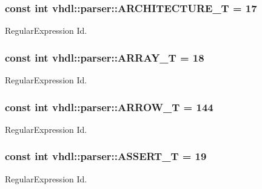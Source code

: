 \subsubsection[{A\+R\+C\+H\+I\+T\+E\+C\+T\+U\+R\+E\+\_\+\+T}]{\setlength{\rightskip}{0pt plus 5cm}const int vhdl\+::parser\+::\+A\+R\+C\+H\+I\+T\+E\+C\+T\+U\+R\+E\+\_\+\+T = 17}\label{namespacevhdl_1_1parser_af0012e28fb9ccb82c9da77dea0e16306}
Regular\+Expression Id. \hypertarget{namespacevhdl_1_1parser_a577d9a64a538d79fbbd07f2914a9b32c}{}
\subsubsection[{A\+R\+R\+A\+Y\+\_\+\+T}]{\setlength{\rightskip}{0pt plus 5cm}const int vhdl\+::parser\+::\+A\+R\+R\+A\+Y\+\_\+\+T = 18}\label{namespacevhdl_1_1parser_a577d9a64a538d79fbbd07f2914a9b32c}
Regular\+Expression Id. \hypertarget{namespacevhdl_1_1parser_a9676969d3bfe6c86f9e0a77081d29c5a}{}
\subsubsection[{A\+R\+R\+O\+W\+\_\+\+T}]{\setlength{\rightskip}{0pt plus 5cm}const int vhdl\+::parser\+::\+A\+R\+R\+O\+W\+\_\+\+T = 144}\label{namespacevhdl_1_1parser_a9676969d3bfe6c86f9e0a77081d29c5a}
Regular\+Expression Id. \hypertarget{namespacevhdl_1_1parser_a25e9088030a083ed630db133150ed351}{}
\subsubsection[{A\+S\+S\+E\+R\+T\+\_\+\+T}]{\setlength{\rightskip}{0pt plus 5cm}const int vhdl\+::parser\+::\+A\+S\+S\+E\+R\+T\+\_\+\+T = 19}\label{namespacevhdl_1_1parser_a25e9088030a083ed630db133150ed351}
Regular\+Expression Id. \hypertarget{namespacevhdl_1_1parser_a4f617d03b545413796de058cbed816a1}{}
